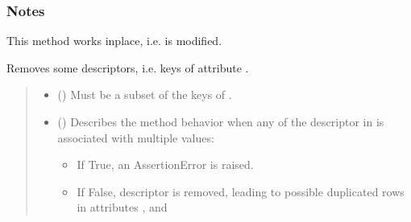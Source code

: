 \documentclass[letterpaper,10pt,english]{sphinxmanual}
\begin{document}
\begin{fulllineitems}
\begin{fulllineitems}
\begin{quote}
\begin{description}
\end{description}\end{quote}
\subsubsection*{Notes}

\sphinxAtStartPar
This method works inplace, i.e.  is modified.

\end{fulllineitems}


\begin{fulllineitems}
\label{\detokenize{generated/tamos.data_IO.ResultsBatch:tamos.data_IO.ResultsBatch.remove_descriptors}}
\pysigstartsignatures
{}
\pysigstopsignatures
\sphinxAtStartPar
Removes some descriptors, i.e. keys of attribute .
\begin{quote}\begin{description}
\begin{itemize}
\item {} 
\sphinxAtStartPar
{} () \textendash{} Must be a subset of the keys of .

\item {} 
\sphinxAtStartPar
{} (\sphinxstyleliteralemphasis{\sphinxupquote{, }}\sphinxstyleliteralemphasis{\sphinxupquote{, }}) \textendash{} 
\sphinxAtStartPar
Describes the method behavior when any of the descriptor in  is associated with multiple values:
\begin{itemize}
\item {} 
\sphinxAtStartPar
If True, an AssertionError is raised.

\item {} 
\sphinxAtStartPar
If False, descriptor is removed, leading to possible duplicated rows in attributes ,  and 


\end{itemize}
\end{itemize}
\end{description}
\end{quote}
\end{fulllineitems}
\end{fulllineitems}
\end{document}
